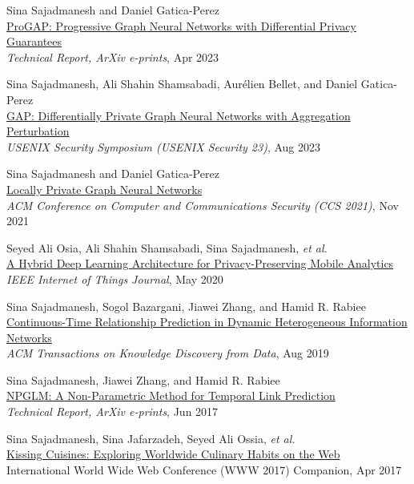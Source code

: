 \documentclass[10pt]{article}
\begin{document}
\begin{outerlist}
	\item {Sina Sajadmanesh} and Daniel Gatica-Perez\\
	\href{https://arxiv.org/abs/2304.08928}{{ProGAP: Progressive Graph Neural Networks with Differential Privacy Guarantees}}\\
	\textit{Technical Report, ArXiv e-prints}, Apr 2023

	\item {Sina Sajadmanesh}, Ali Shahin Shamsabadi, Aurélien Bellet, and Daniel Gatica-Perez\\
	\href{https://arxiv.org/abs/2203.00949}{{GAP: Differentially Private Graph Neural Networks with Aggregation Perturbation}}\\
	\textit{USENIX Security Symposium (USENIX Security 23)}, Aug 2023

	\item {Sina Sajadmanesh} and Daniel Gatica-Perez\\
	\href{https://arxiv.org/abs/2006.05535}{{Locally Private Graph Neural Networks}}\\
	\textit{ACM Conference on Computer and Communications Security (CCS 2021)}, Nov 2021

	\item Seyed Ali Osia, Ali Shahin Shamsabadi, {Sina Sajadmanesh}, \textit{et al.}\\
	\href{https://arxiv.org/abs/1703.02952}{{A Hybrid Deep Learning Architecture for Privacy-Preserving Mobile Analytics}}\\
	\textit{IEEE Internet of Things Journal}, May 2020

	\item {Sina Sajadmanesh}, Sogol Bazargani, Jiawei Zhang, and Hamid R. Rabiee\\
	\href{https://arxiv.org/abs/1710.00818}{{Continuous-Time Relationship Prediction in Dynamic Heterogeneous Information Networks}}\\
	\textit{ACM Transactions on Knowledge Discovery from Data}, Aug 2019

	\item {Sina Sajadmanesh}, Jiawei Zhang, and Hamid R. Rabiee\\
	\href{https://arxiv.org/abs/1706.06783}{{NPGLM: A Non-Parametric Method for Temporal Link Prediction}}\\
	\textit{Technical Report, ArXiv e-prints}, Jun 2017

	\item {Sina Sajadmanesh}, Sina Jafarzadeh, Seyed Ali Ossia, \textit{et al.}\\
	\href{https://arxiv.org/pdf/1610.08469}{{Kissing Cuisines: Exploring Worldwide Culinary Habits on the Web}}\\
	International World Wide Web Conference (WWW 2017) Companion, Apr 2017


\end{outerlist}
\end{document}
